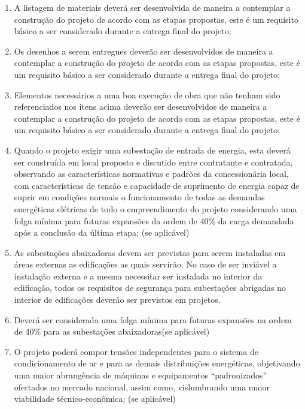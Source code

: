 \begin{enumerate}
	\item A listagem de materiais deverá ser desenvolvida de maneira a contemplar a construção do projeto de acordo com as etapas propostas, este é um requisito básico a ser considerado durante a entrega final do projeto;
	
	\item Os desenhos a serem entregues deverão ser desenvolvidos de maneira a contemplar a construção do projeto de acordo com as etapas propostas, este é um requisito básico a ser considerado durante a entrega final do projeto;
	
	\item Elementos necessários a uma boa execução de obra que não tenham sido referenciados nos itens acima deverão ser desenvolvidos de maneira a contemplar a construção do projeto de acordo com as etapas propostas, este é um requisito básico a ser considerado durante a entrega final do projeto;
	
	\item Quando o projeto exigir uma subestação de entrada de energia, esta deverá ser construída em local proposto e discutido entre contratante e contratada, observando as características normativas e padrões da concessionária local, com características de tensão e capacidade de suprimento de energia capaz de suprir em condições normais o funcionamento de todas as demandas energéticas elétricas de todo o empreendimento do projeto considerando uma folga mínima para futuras expansões da ordem de 40\% da carga demandada após a conclusão da última etapa; (se aplicável)
	
	\item As subestações abaixadoras devem ser previstas para serem instaladas em áreas externas as edificações as quais servirão. No caso de ser inviável a instalação externa e a mesma necessitar ser instalada no interior da edificação, todos os requisitos de segurança para subestações abrigadas no interior de edificações deverão ser previstos em projetos.
	
	\item Deverá ser considerada uma folga mínima para futuras expansões na ordem de 40\% para as subestações abaixadoras(se aplicável)
	
	\item O projeto poderá compor tensões independentes para o sistema de condicionamento de ar e para as demais distribuições energéticas, objetivando uma maior abrangência de máquinas e equipamentos “padronizados” ofertados no mercado nacional, assim como, vislumbrando uma maior viabilidade técnico-econômica; (se aplicável)
	

\end{enumerate}
